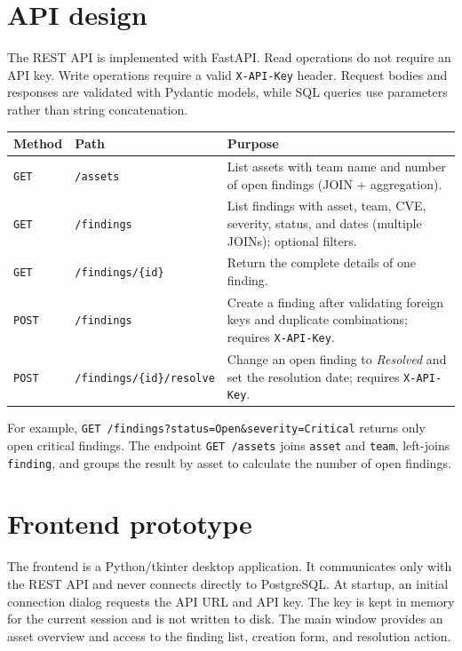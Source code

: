 \documentclass[11pt,a4paper]{article}
\begin{document}
\section{API design}

The REST API is implemented with FastAPI. Read operations do not require an API
key. Write operations require a valid \texttt{X-API-Key} header. Request bodies
and responses are validated with Pydantic models, while SQL queries use
parameters rather than string concatenation.

\renewcommand{\arraystretch}{1.2}
\begin{tabularx}{\linewidth}{@{}p{1.6cm}p{4.2cm}X@{}}
\toprule
\textbf{Method} & \textbf{Path} & \textbf{Purpose} \\
\midrule
\texttt{GET} & \texttt{/assets} & List assets with team name and number of open
findings (JOIN + aggregation). \\
\texttt{GET} & \texttt{/findings} & List findings with asset, team, CVE,
severity, status, and dates (multiple JOINs); optional filters. \\
\texttt{GET} & \texttt{/findings/\{id\}} & Return the complete details of one
finding. \\
\texttt{POST} & \texttt{/findings} & Create a finding after validating foreign
keys and duplicate combinations; requires \texttt{X-API-Key}. \\
\texttt{POST} & \texttt{/findings/\{id\}/resolve} & Change an open finding to
\emph{Resolved} and set the resolution date; requires \texttt{X-API-Key}. \\
\bottomrule
\end{tabularx}

For example,
\texttt{GET /findings?status=Open\&severity=Critical} returns only open critical
findings. The endpoint \texttt{GET /assets} joins \texttt{asset} and
\texttt{team}, left-joins \texttt{finding}, and groups the result by asset to
calculate the number of open findings.

\section{Frontend prototype}

The frontend is a Python/tkinter desktop application. It communicates only with
the REST API and never connects directly to PostgreSQL. At startup, an initial
connection dialog requests the API URL and API key. The key is kept in memory
for the current session and is not written to disk. The main window provides an
asset overview and access to the finding list, creation form, and resolution
action.
\end{document}
